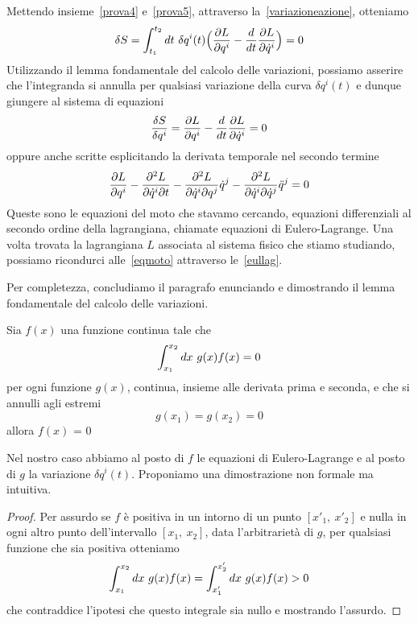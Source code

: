     Mettendo insieme~\eqref{prova4} e~\eqref{prova5}, attraverso la~\eqref{variazioneazione}, otteniamo
    \begin{equation*}
        \delta S = \int_{t_1}^{t_2}dt~ \delta q^i(t) \Big (\frac{\partial L}{\partial q^i}  - \frac{d}{dt} \frac{\partial L}{\partial\dot q^i} \Big) = 0
    \end{equation*}
    Utilizzando il lemma fondamentale del calcolo delle variazioni, possiamo asserire che l'integranda si annulla per qualsiasi variazione della curva $\delta q^i(t)$ e dunque giungere al sistema di equazioni
    \begin{equation} \label{eullag}
        \frac{\delta S}{\delta q^i} = \frac{\partial L}{\partial q^i}  - \frac{d}{dt} \frac{\partial L}{\partial\dot q^i} = 0
    \end{equation}
    oppure anche scritte esplicitando la derivata temporale nel secondo termine
    \begin{equation*} 
        \frac{\partial L}{\partial q^i}  - \frac{\partial^2 L}{\partial\dot q^i \partial t} - \frac{\partial^2 L}{\partial\dot q^i \partial q^j} \dot q^j - \frac{\partial^2 L}{\partial\dot q^i \partial\dot q^j} \ddot q^j = 0
    \end{equation*}
    Queste sono le equazioni del moto che stavamo cercando, equazioni differenziali al secondo ordine della lagrangiana, chiamate equazioni di Eulero-Lagrange. Una volta trovata la lagrangiana $L$ associata al sistema fisico che stiamo studiando, possiamo ricondurci alle~\eqref{eqmoto} attraverso le~\eqref{eullag}.

    \hfill 

    Per completezza, concludiamo il paragrafo enunciando e dimostrando il lemma fondamentale del calcolo delle variazioni.
    \begin{lemma}
        Sia $f(x)$ una funzione continua tale che 
    \begin{equation*}
        \int_{x_1}^{x_2}dx~ g(x) f(x) = 0 
    \end{equation*}
        per ogni funzione $g(x)$, continua, insieme alle derivata prima e seconda, e che si annulli agli estremi
    \begin{equation*}
        g(x_1) = g(x_2) = 0
    \end{equation*}
        allora $f(x)$ = 0
    \end{lemma}
    Nel nostro caso abbiamo al posto di $f$ le equazioni di Eulero-Lagrange e al posto di $g$ la variazione $\delta q^i(t)$. Proponiamo una dimostrazione non formale ma intuitiva.
    \begin{proof}
        Per assurdo se $f$ è positiva in un intorno di un punto $[x'_1, ~ x'_2]$ e nulla in ogni altro punto dell'intervallo $[x_1, ~ x_2]$, data l'arbitrarietà di $g$, per qualsiasi funzione che sia positiva otteniamo
    \begin{equation*}
        \int_{x_1}^{x_2}dx~ g(x) f(x) = \int_{x'_1}^{x'_2}dx~ g(x) f(x) > 0
    \end{equation*} 
        che contraddice l'ipotesi che questo integrale sia nullo e mostrando l'assurdo.
    \end{proof}

